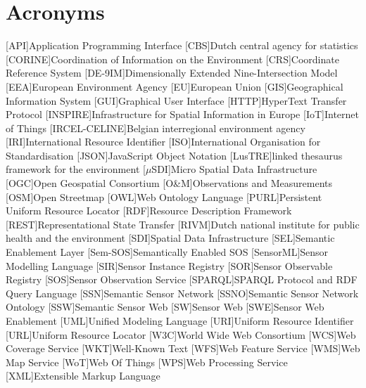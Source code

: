 \chapter*{Acronyms}

\begin{acronym}[UML]
  [API]{Application Programming Interface}
  [CBS]{Dutch central agency for statistics}
  [CORINE]{Coordination of Information on the Environment} 
  [CRS]{Coordinate Reference System} 
  [DE-9IM]{Dimensionally Extended Nine-Intersection Model}
  [EEA]{European Environment Agency}
  [EU]{European Union}
  [GIS]{Geographical Information System}
  [GUI]{Graphical User Interface}
  [HTTP]{HyperText Transfer Protocol}
  [INSPIRE]{Infrastructure for Spatial Information in Europe}
  [IoT]{Internet of Things}
  [IRCEL-CELINE]{Belgian interregional environment agency}
  [IRI]{International Resource Identifier}
  [ISO]{International Organisation for Standardisation}
  [JSON]{JavaScript Object Notation}
  [LusTRE]{linked thesaurus framework for the environment} 
  [$\mu$SDI]{Micro Spatial Data Infrastructure}
  [OGC]{Open Geospatial Consortium}
  [O\&M]{Observations and Measurements}
  [OSM]{Open Streetmap}
  [OWL]{Web Ontology Language}
  [PURL]{Persistent Uniform Resource Locator}
  [RDF]{Resource Description Framework}
  [REST]{Representational State Transfer}
  [RIVM]{Dutch national institute for public health and the environment}
  [SDI]{Spatial Data Infrastructure}
  [SEL]{Semantic Enablement Layer}
  [Sem-SOS]{Semantically Enabled SOS}
  [SensorML]{Sensor Modelling Language}
  [SIR]{Sensor Instance Registry}
  [SOR]{Sensor Observable Registry}
  [SOS]{Sensor Observation Service}
  [SPARQL]{SPARQL Protocol and RDF Query Language}
  [SSN]{Semantic Sensor Network}
  [SSNO]{Semantic Sensor Network Ontology}
  [SSW]{Semantic Sensor Web}
  [SW]{Sensor Web}
  [SWE]{Sensor Web Enablement}
  [UML]{Unified Modeling Language}
  [URI]{Uniform Resource Identifier}
  [URL]{Uniform Resource Locator}
  [W3C]{World Wide Web Consortium}
  [WCS]{Web Coverage Service}
  [WKT]{Well-Known Text}
  [WFS]{Web Feature Service}
  [WMS]{Web Map Service}
  [WoT]{Web Of Things}
  [WPS]{Web Processing Service}
  [XML]{Extensible Markup Language}
\end{acronym}